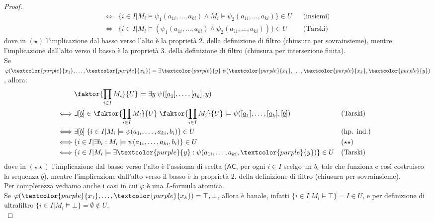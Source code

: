 \begin{proof}
\begin{align*}
            \iff& \{i \in I | M_i \models \psi_1(a_{1i},\ldots,a_{ki}) \land M_i \models \psi_2(a_{1i},\ldots,a_{ki})\} \in U && \text{(insiemi)}\\
            \iff& \{i \in I | M_i \models (\psi_1(a_{1i},\ldots,a_{ki}) \land \psi_2(a_{1i},\ldots,a_{ki}))\} \in U && \text{(Tarski)}
        \end{align*}
    dove in $(\star)$ l'implicazione dal basso verso l'alto è la proprietà 2. della definizione di filtro (chiusura per sovrainsieme), mentre l'implicazione dall'alto verso il basso è la proprietà 3. della definizione di filtro (chiusura per intersezione finita).\\
    Se $\varphi(\textcolor{purple}{x_1},\ldots,\textcolor{purple}{x_k}) = \exists \textcolor{purple}{y} \; \psi(\textcolor{purple}{x_1},\ldots,\textcolor{purple}{x_k},\textcolor{purple}{y})$, allora:
        \begin{align*}
            &\faktor{\prod_{i \in I} M_i}{U} \models \exists y \; \psi([\underline a_1],\ldots,[\underline a_k],y) \\
            \iff& \exists [\underline b] \in \faktor{\prod_{i \in I} M_i}{U} \; \faktor{\prod_{i \in I} M_i}{U} \models \psi([\underline a_1],\ldots,[\underline a_k],[\underline b]) && \text{(Tarski)}\\
            \iff& \exists [\underline b] \; \{i \in I | M_i \models \psi(a_{1i},\ldots,a_{ki},b_i)\} \in U && \text{(hp. ind.)}\\
            \iff& \{i \in I | \exists b_i : M_i \models \psi(a_{1i},\ldots,a_{ki},b_i)\} \in U && (\star\star)\\
            \iff& \{i \in I | M_i \models \exists  \textcolor{purple}{y} : \psi(a_{1i},\ldots,a_{ki},\textcolor{purple}{y})\} \in U && \text{(Tarski)}
        \end{align*}
        dove in $(\star\star)$ l'implicazione dal basso verso l'alto è l'assioma di scelta ($\mathsf{AC}$, per ogni $i \in I$ scelgo un $b_i$ tale che funziona e così costruisco la sequenza $\underline b$), mentre l'implicazione dall'alto verso il basso è la proprietà 2. della definizione di filtro (chiusura per sovrainsieme).\\
        Per completezza vediamo anche i casi in cui $\varphi$ è una $L$-formula atomica.\\
        Se $\varphi(\textcolor{purple}{x_1},\ldots,\textcolor{purple}{x_k}) = \top, \bot$, allora è banale, infatti $\{i \in I | M_i \models \top\} = I \in U$, e per definizione di ultrafiltro $\{i \in I | M_i \models \bot\} = \emptyset \notin U$.\\

\end{proof}
